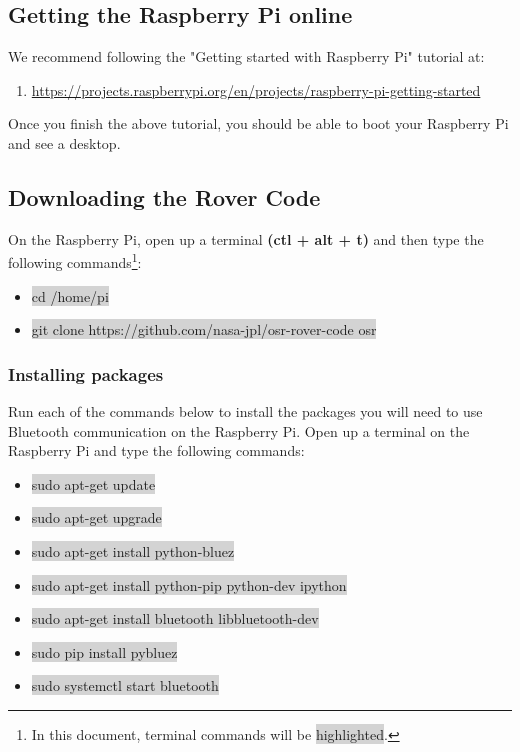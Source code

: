 \documentclass[12pt]{article}
\begin{document}
\subsection{Getting the Raspberry Pi online}

We recommend following the "Getting started with Raspberry Pi" tutorial at:

\begin{enumerate}
	\item[] \href{https://projects.raspberrypi.org/en/projects/raspberry-pi-getting-started}{https://projects.raspberrypi.org/en/projects/raspberry-pi-getting-started}
\end{enumerate}

Once you finish the above tutorial, you should be able to boot your Raspberry Pi and see a desktop.

\subsection{Downloading the Rover Code}
On the Raspberry Pi, open up a terminal \textbf{(ctl + alt + t)} and then type the following commands\footnote{In this document, terminal commands will be \colorbox{lightgray}{highlighted}.}:

\begin{itemize}
	\item[] \colorbox{lightgray}{cd /home/pi}
	\item[] \colorbox{lightgray}{git clone https://github.com/nasa-jpl/osr-rover-code osr}
\end{itemize}

\subsubsection{Installing packages}
Run each of the commands below to install the packages you will need to use Bluetooth communication on the Raspberry Pi. Open up a terminal on the Raspberry Pi  and type the following commands:
\begin{itemize}
	\item[] \colorbox{lightgray}{sudo apt-get update}
	\item[] \colorbox{lightgray}{sudo apt-get upgrade}
	\item[] \colorbox{lightgray}{sudo apt-get install python-bluez}
	\item[] \colorbox{lightgray}{sudo apt-get install python-pip python-dev ipython}
	\item[] \colorbox{lightgray}{sudo apt-get install bluetooth libbluetooth-dev}
	\item[] \colorbox{lightgray}{sudo pip install pybluez}
	\item[] \colorbox{lightgray}{sudo systemctl start bluetooth}

\end{itemize}
\end{document}
